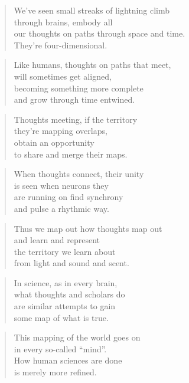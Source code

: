\documentclass[14pt,a4paper]{article}
\begin{document}
\begin{verse}
We’ve seen small streaks of lightning climb\\
through brains, embody all\\
our thoughts on paths through space and time.\\
They’re four-dimensional.
\end{verse}

\begin{verse}
Like humans, thoughts on paths that meet,\\
will sometimes get aligned,\\
becoming something more complete\\
and grow through time entwined.
\end{verse}

\begin{verse}
Thoughts meeting, if the territory\\
they’re mapping overlaps,\\
obtain an opportunity\\
to share and merge their maps.
\end{verse}

\begin{verse}
When thoughts connect, their unity\\
is seen when neurons they\\
are running on find synchrony\\
and pulse a rhythmic way.
\end{verse}

\begin{verse}
Thus we map out how thoughts map out\\
and learn and represent\\
the territory we learn about\\
from light and sound and scent.
\end{verse}

\begin{verse}
In science, as in every brain,\\
what thoughts and scholars do\\
are similar attempts to gain\\
some map of what is true.
\end{verse}

\begin{verse}
This mapping of the world goes on\\
in every so-called “mind”.\\
How human sciences are done\\
is merely more refined.
\end{verse}
\end{document}
